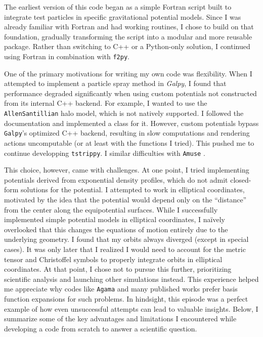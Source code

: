 \documentclass{article}
\begin{document}
        The earliest version of this code began as a simple Fortran script built to integrate test particles in specific gravitational potential models. Since I was already familiar with Fortran and had working routines, I chose to build on that foundation, gradually transforming the script into a modular and more reusable package. Rather than switching to C++ or a Python-only solution, I continued using Fortran in combination with \texttt{f2py}.

        One of the primary motivations for writing my own code was flexibility. When I attempted to implement a particle spray method in \textit{Galpy}, I found that performance degraded significantly when using custom potentials not constructed from its internal C++ backend. For example, I wanted to use the \texttt{AllenSantillian} halo model, which is not natively supported. I followed the documentation and implemented a class for it. However, custom potentials bypass \texttt{Galpy}'s optimized C++ backend, resulting in slow computations and rendering actions uncomputable (or at least with the functions I tried). This pushed me to continue developping \texttt{tstrippy}. I similar difficulties with \texttt{Amuse} \citep{2013A&A...557A..84P}.

        This choice, however, came with challenges. At one point, I tried implementing potentials derived from exponential density profiles, which do not admit closed-form solutions for the potential. I attempted to work in elliptical coordinates, motivated by the idea that the potential would depend only on the ``distance'' from the center along the equipotential surfaces. While I successfully implemented simple potential models in elliptical coordinates, I naïvely overlooked that this changes the equations of motion entirely due to the underlying geometry. I found that my orbits always diverged (except in special cases). It was only later that I realized I would need to account for the metric tensor and Christoffel symbols to properly integrate orbits in elliptical coordinates. At that point, I chose not to pursue this further, prioritizing scientific analysis and launching other simulations instead. This experience helped me appreciate why codes like \texttt{Agama} and many published works prefer basis function expansions for such problems. In hindsight, this episode was a perfect example of how even unsuccessful attempts can lead to valuable insights. Below, I summarize some of the key advantages and limitations I encountered while developing a code from scratch to answer a scientific question.
\end{document}
